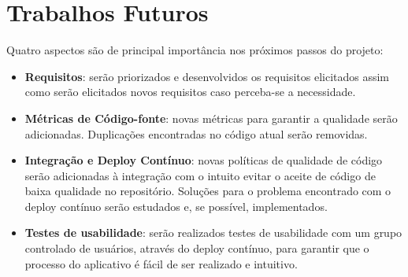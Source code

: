 \section{Trabalhos Futuros}

Quatro aspectos são de principal importância nos próximos passos do projeto:

\begin{itemize}
    \item \textbf{Requisitos}: serão priorizados e desenvolvidos os requisitos elicitados assim como serão elicitados novos requisitos caso perceba-se a necessidade.
    \item \textbf{Métricas de Código-fonte}: novas métricas para garantir a qualidade serão adicionadas. Duplicações encontradas no código atual serão removidas.
    \item \textbf{Integração e Deploy Contínuo}: novas políticas de qualidade de código serão adicionadas à integração com o intuito evitar o aceite de código de baixa qualidade no repositório. Soluções para o problema encontrado com o deploy contínuo serão estudados e, se possível, implementados.
    \item \textbf{Testes de usabilidade}: serão realizados testes de usabilidade com um grupo controlado de usuários, através do deploy contínuo, para garantir que o processo do aplicativo é fácil de ser realizado e intuitivo.
\end{itemize}

